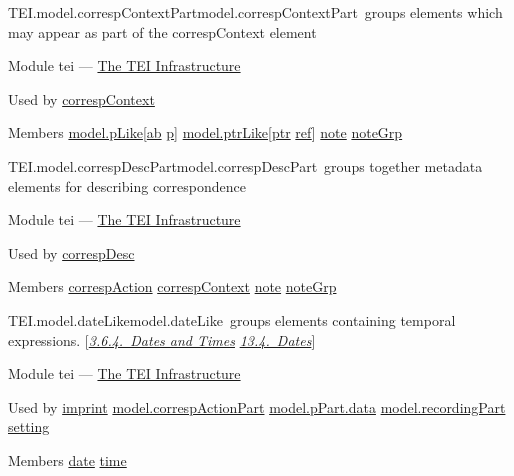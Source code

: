 \begin{reflist}
\item[]\begin{specHead}{TEI.model.correspContextPart}{model.correspContextPart} groups elements which may appear as part of the correspContext element\end{specHead} 
    \item[{Module}]
  tei — \hyperref[ST]{The TEI Infrastructure}
    \item[{Used by}]
  \hyperref[TEI.correspContext]{correspContext}
    \item[{Members}]
  \hyperref[TEI.model.pLike]{model.pLike}[\hyperref[TEI.ab]{ab} \hyperref[TEI.p]{p}] \hyperref[TEI.model.ptrLike]{model.ptrLike}[\hyperref[TEI.ptr]{ptr} \hyperref[TEI.ref]{ref}] \hyperref[TEI.note]{note} \hyperref[TEI.noteGrp]{noteGrp}
\end{reflist}  
\begin{reflist}
\item[]\begin{specHead}{TEI.model.correspDescPart}{model.correspDescPart} groups together metadata elements for describing correspondence\end{specHead} 
    \item[{Module}]
  tei — \hyperref[ST]{The TEI Infrastructure}
    \item[{Used by}]
  \hyperref[TEI.correspDesc]{correspDesc}
    \item[{Members}]
  \hyperref[TEI.correspAction]{correspAction} \hyperref[TEI.correspContext]{correspContext} \hyperref[TEI.note]{note} \hyperref[TEI.noteGrp]{noteGrp}
\end{reflist}  
\begin{reflist}
\item[]\begin{specHead}{TEI.model.dateLike}{model.dateLike} groups elements containing temporal expressions. [\textit{\hyperref[CONADA]{3.6.4.\ Dates and Times}} \textit{\hyperref[NDDATE]{13.4.\ Dates}}]\end{specHead} 
    \item[{Module}]
  tei — \hyperref[ST]{The TEI Infrastructure}
    \item[{Used by}]
  \hyperref[TEI.imprint]{imprint} \hyperref[TEI.model.correspActionPart]{model.correspActionPart} \hyperref[TEI.model.pPart.data]{model.pPart.data} \hyperref[TEI.model.recordingPart]{model.recordingPart} \hyperref[TEI.setting]{setting}
    \item[{Members}]
  \hyperref[TEI.date]{date} \hyperref[TEI.time]{time}
\end{reflist}  
